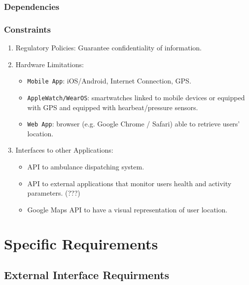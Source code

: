 \documentclass[12pt,a4paper]{article}
\begin{document}
			\subsubsection{Dependencies}
			\subsubsection{Constraints}
				\begin{enumerate}
					\item Regulatory Policies:
							Guarantee confidentiality of information.
					\item Hardware Limitations: 
						\begin{itemize}
							\item \texttt{Mobile App}: iOS/Android, Internet Connection, GPS.
							\item \texttt{AppleWatch/WearOS}: smartwatches linked to mobile devices or equipped with GPS and equipped with hearbeat/pressure sensors.
							\item \texttt{Web App}: browser (e.g. Google Chrome / Safari) able to retrieve users' location.
						\end{itemize}
					\item Interfaces to other Applications: 
						\begin{itemize}
							\item API to ambulance dispatching system.
							\item API to external applications that monitor users health and activity parameters. (???)
						    \item Google Maps API to have a visual representation of user location.
						\end{itemize}
				\end{enumerate}
		
	\newpage
	\section{Specific Requirements}
	\subsection{External Interface Requirments}
\end{document}
